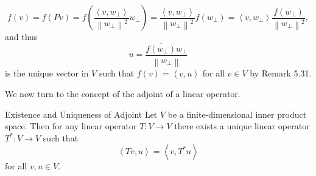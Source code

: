 \documentclass[linearalgebraII]{subfiles}
\begin{document}
\begin{remark}
        \begin{equation*}
            f(v) = f\left( Pv \right) = f\left( \frac{\left\langle v, w_\perp\right\rangle }{\left\lVert w_\perp\right\rVert ^2}w_\perp \right) = \frac{\left\langle v, w_\perp\right\rangle }{\left\lVert w_\perp\right\rVert ^2}f\left( w_\perp \right) = \left\langle v, w_\perp\right\rangle \frac{f\left( w_\perp \right) }{\left\lVert w_\perp\right\rVert ^2},
        \end{equation*}
        and thus
        \begin{equation*}
            u = \frac{\overline{f\left( w_\perp \right) }w_\perp}{\left\lVert w_\perp\right\rVert }
        \end{equation*}
        is the unique vector in $V$ such that $f(v) = \left\langle v, u\right\rangle$ for all $v\in V$ by Remark 5.31.
    \end{remark}

    \begin{remark}
        We now turn to the concept of the adjoint of a linear operator.
    \end{remark}

    \begin{theorem}{Existence and Uniqueness of Adjoint}
        Let $V$ be a finite-dimensional inner product space. Then for any linear operator $T:V\to V$ there exists a unique linear operator $T^*:V\to V$ such that
        \begin{equation*}
            \left\langle Tv, u\right\rangle = \left\langle v, T^*u\right\rangle 
        \end{equation*}
        for all $v,u\in V$.
    \end{theorem}
\end{document}
